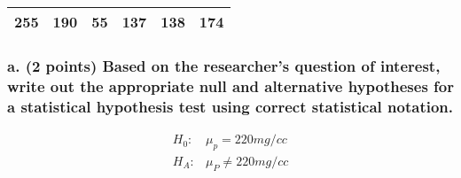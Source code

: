 \documentclass[
]{article}
\begin{document}
\begin{longtable}[]{@{}rrrrrr@{}}
\toprule
\endhead
255 & 190 & 55 & 137 & 138 & 174 \\
\bottomrule
\end{longtable}

\hypertarget{a.-2-points-based-on-the-researchers-question-of-interest-write-out-the-appropriate-null-and-alternative-hypotheses-for-a-statistical-hypothesis-test-using-correct-statistical-notation.}{%
\subsubsection{a. (2 points) Based on the researcher's question of
interest, write out the appropriate null and alternative hypotheses for
a statistical hypothesis test using correct statistical
notation.}\label{a.-2-points-based-on-the-researchers-question-of-interest-write-out-the-appropriate-null-and-alternative-hypotheses-for-a-statistical-hypothesis-test-using-correct-statistical-notation.}}

\begin{align*}
H_0:&\mu_p =220 mg/cc\\

H_A:&\mu_P \neq 220 mg/cc
\end{align*}
\end{document}
